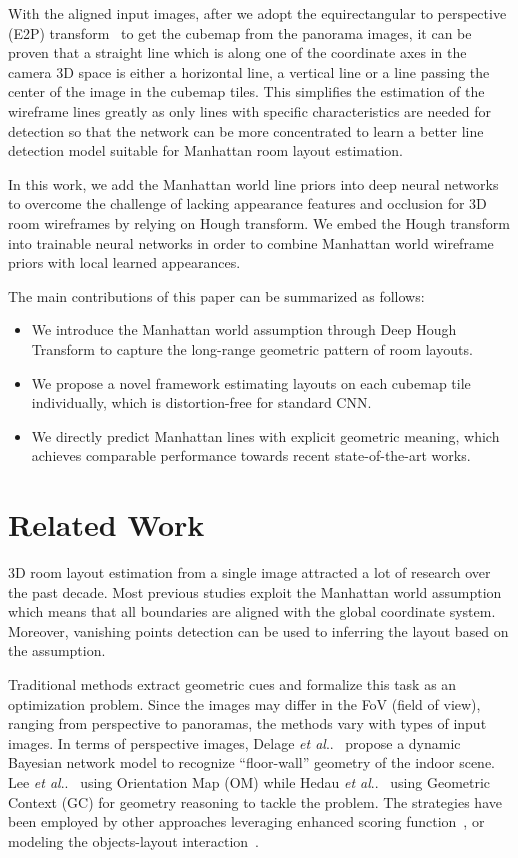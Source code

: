 \documentclass[runningheads]{llncs}
\makeatletter
\DeclareRobustCommand\onedot{\futurelet\@let@token\@onedot}
\def\@onedot{\ifx\@let@token.\else.\null\fi\xspace}
\def\etal{\emph{et al}\onedot}
\makeatother
\begin{document}
With the aligned input images, after we adopt the equirectangular to perspective (E2P) transform~\cite{ng2005data,yang2019dula} to get the cubemap from the panorama images, it can be proven that a straight line which is along one of the coordinate axes in the camera 3D space is either a horizontal line, a vertical line or a line passing the center of the image in the cubemap tiles. This simplifies the estimation of the wireframe lines greatly as only lines with specific characteristics are needed for detection so that the network can be more concentrated to learn a better line detection model suitable for Manhattan room layout estimation. 

In this work, we add the Manhattan world line priors into deep neural networks to overcome the challenge of lacking appearance features and occlusion for 3D room wireframes by relying on Hough transform. We embed the Hough transform into trainable neural networks in order to combine Manhattan world wireframe priors with local learned appearances.

The main contributions of this paper can be summarized as follows: 
\begin{itemize}
    \item We introduce the Manhattan world assumption through Deep Hough Transform to capture the long-range geometric pattern of room layouts.
    \item We propose a novel framework estimating layouts on each cubemap tile individually, which is distortion-free for standard CNN.
    \item We directly predict Manhattan lines with explicit geometric meaning, which achieves comparable performance towards recent state-of-the-art works.
\end{itemize}

%
 \section{Related Work}
3D room layout estimation from a single image attracted a lot of research over the past decade. Most previous studies exploit the Manhattan world assumption~\cite{coughlan1999manhattan} which means that all boundaries are aligned with the global coordinate system. Moreover, vanishing points detection can be used to inferring the layout based on the assumption.

Traditional methods extract geometric cues and formalize this task as an optimization problem. Since the images may differ in the FoV (ﬁeld of view), ranging from perspective to  panoramas, the methods vary with types of input images.
In terms of perspective images, Delage \etal~\cite{delage2006dynamic} propose a dynamic Bayesian network model to recognize ``floor-wall'' geometry of the indoor scene. Lee \etal~\cite{lee2009geometric} using Orientation Map (OM) while Hedau \etal~\cite{hedau2009recovering} using Geometric Context (GC) for geometry reasoning to tackle the problem. The strategies have been employed by other approaches leveraging enhanced scoring function~\cite{schwing2012efficient,schwing2012efficient2}, or modeling the objects-layout interaction~\cite{del2013understanding,gupta2010estimating,zhao2013scene}.
\end{document}
